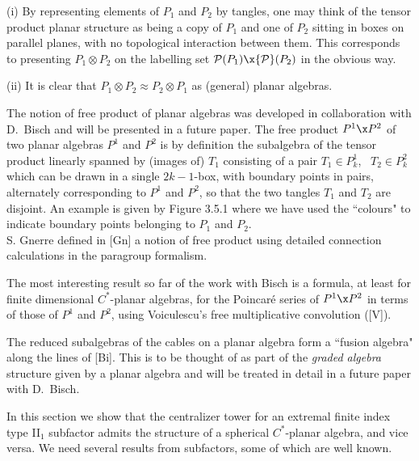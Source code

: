  (i) By representing elements of $P_1$ and $P_2$  by
tangles, one may think of the tensor product planar structure as
being a copy of $P_1$ and one of $P_2$ sitting in boxes on
parallel planes, with no topological interaction between them.
This corresponds to presenting
$P_1\otimes P_2$  on the labelling set ${\cal P}(P_1)\x{\cal P}(P_2)$
in the obvious way.

(ii) It is clear that $P_1\otimes P_2\approx P_2\otimes P_1$ as
(general) planar algebras.

\bs\bs{}

The notion of free product of planar algebras was developed in
collaboration with D.~Bisch and will be presented in a future
paper. The free product $P^1\x P^2$ of two planar algebras
$P^1$ and $P^2$ is by definition the subalgebra of the tensor
product linearly spanned by (images of) $T_1$ consisting of a pair
$T_1\in P^1_k$, \ $T_2\in P^2_k$ which can be drawn in a single
$2k-1$-box, with boundary points in pairs, alternately
corresponding to $P^1$ and $P^2$, so that the two tangles
$T_1$ and $T_2$ are disjoint. An example is given by Figure 3.5.1
where we have used the ``colours" to indicate boundary points
belonging to $P_1$ and $P_2$.
\[
        
\]
S. Gnerre defined in [Gn] a notion of free product using
detailed connection calculations in the paragroup 
formalism.

\bs The most interesting result so far of the work with Bisch is a
formula, at least for finite dimensional  $C^*$-planar algebras,
for the Poincar\'e series of $P^1\x P^2$ in terms of those of
$P^1$ and $P^2$, using Voiculescu's free multiplicative convolution
([V]).

\bs
{}

The reduced subalgebras of the cables on a planar algebra form a
``fusion algebra" along the lines of [Bi]. This is to be
thought of as part of the {\it graded algebra} structure given by a
planar algebra and will be treated in detail in a future paper with
D.~Bisch.

\bs\bs
{}

In this section we show that the centralizer tower for an extremal
finite index type II${}_1$ subfactor admits the structure of a
 spherical $C^*$-planar algebra, and vice versa. We need
several results from subfactors, some of which are well known.

\medskip{}

